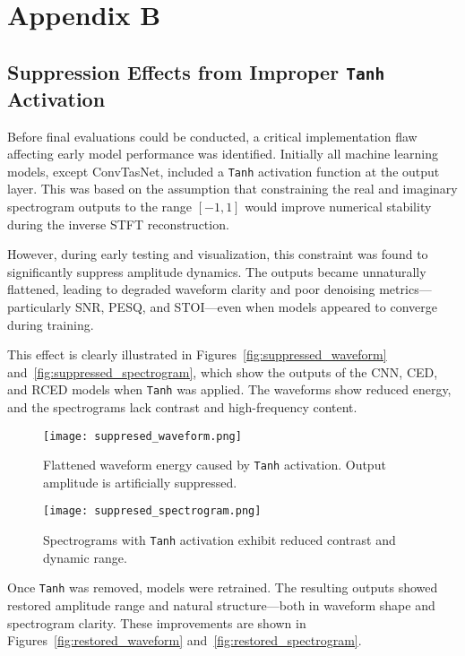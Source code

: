 \graphicspath{{content/appendices/figures}}
\chapter{Appendix B}
\label{appendix:appendix_b}

\section{Suppression Effects from Improper \texttt{Tanh} Activation}
\label{sec:tanh_removal}

Before final evaluations could be conducted, a critical implementation flaw affecting early model performance was identified. Initially all machine learning models, except ConvTasNet, included a \texttt{Tanh} activation function at the output layer. This was based on the assumption that constraining the real and imaginary spectrogram outputs to the range \([-1, 1]\) would improve numerical stability during the inverse STFT reconstruction.

However, during early testing and visualization, this constraint was found to significantly suppress amplitude dynamics. The outputs became unnaturally flattened, leading to degraded waveform clarity and poor denoising metrics—particularly SNR, PESQ, and STOI—even when models appeared to converge during training.

This effect is clearly illustrated in Figures~\ref{fig:suppressed_waveform} and~\ref{fig:suppressed_spectrogram}, which show the outputs of the CNN, CED, and RCED models when \texttt{Tanh} was applied. The waveforms show reduced energy, and the spectrograms lack contrast and high-frequency content.


\begin{figure}[H]
    \centering
    \texttt{[image: suppresed\_waveform.png]}
    \caption{\label{fig:suppresed_waveform} Flattened waveform energy caused by \texttt{Tanh} activation. Output amplitude is artificially suppressed.}
\end{figure}

\begin{figure}[H]
    \centering
    \texttt{[image: suppresed\_spectrogram.png]}
    \caption{\label{fig:suppresed_spectrogram} Spectrograms with \texttt{Tanh} activation exhibit reduced contrast and dynamic range.}
\end{figure}

Once \texttt{Tanh} was removed, models were retrained. The resulting outputs showed restored amplitude range and natural structure—both in waveform shape and spectrogram clarity. These improvements are shown in Figures~\ref{fig:restored_waveform} and~\ref{fig:restored_spectrogram}.

